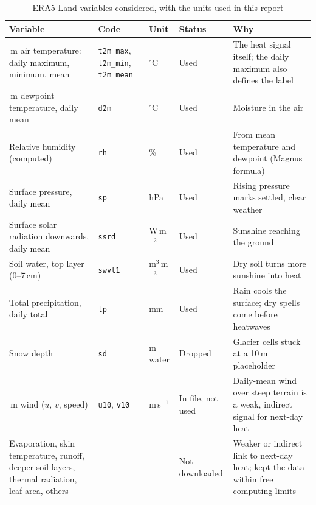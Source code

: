 \documentclass[12pt,a4paper]{report}
\begin{document}
\begin{table}[H]
\centering
\caption{ERA5-Land variables considered, with the units used in this report}
\label{tab:vars}
\footnotesize
\begin{tabularx}{\textwidth}{|>{\raggedright\arraybackslash}p{4.0cm}|>{\raggedright\arraybackslash}p{1.3cm}|>{\raggedright\arraybackslash}p{1.55cm}|>{\raggedright\arraybackslash}p{1.6cm}|>{\raggedright\arraybackslash}X|}
\hline
\textbf{Variable} & \textbf{Code} & \textbf{Unit} & \textbf{Status} & \textbf{Why}\\ \hline
2\,m air temperature: daily maximum, minimum, mean & \texttt{t2m\_max}, \texttt{t2m\_min}, \texttt{t2m\_mean} &
  $^\circ$C & Used & The heat signal itself; the daily maximum also defines the label\\ \hline
2\,m dewpoint temperature, daily mean & \texttt{d2m} & $^\circ$C & Used & Moisture in the air\\ \hline
Relative humidity (computed) & \texttt{rh} & \% & Used & From mean temperature and dewpoint (Magnus formula)\\ \hline
Surface pressure, daily mean & \texttt{sp} & hPa & Used & Rising pressure marks settled, clear weather\\ \hline
Surface solar radiation downwards, daily mean & \texttt{ssrd} & W\,m$^{-2}$ & Used & Sunshine reaching the ground\\ \hline
Soil water, top layer (0--7\,cm) & \texttt{swvl1} & m$^3$\,m$^{-3}$ & Used & Dry soil turns more sunshine into heat\\ \hline
Total precipitation, daily total & \texttt{tp} & mm & Used & Rain cools the surface; dry spells come before
  heatwaves\\ \hline
Snow depth & \texttt{sd} & m water & Dropped & Glacier cells stuck at a 10\,m placeholder\\ \hline
10\,m wind ($u$, $v$, speed) & \texttt{u10}, \texttt{v10} & m\,s$^{-1}$ & In file, not used & Daily-mean wind
  over steep terrain is a weak, indirect signal for next-day heat\\ \hline
Evaporation, skin temperature, runoff, deeper soil layers, thermal radiation, leaf area, others & -- & --
  & Not downloaded & Weaker or indirect link to next-day heat; kept the data within free computing limits\\ \hline
\end{tabularx}
\end{table}

\end{document}
